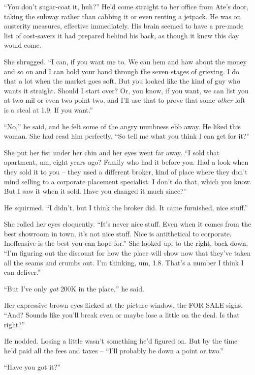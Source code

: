 “You don't sugar-coat it, huh?” He'd come straight to her office 
from Ate's door, taking the subway rather than cabbing it or even 
renting a jetpack. He was on austerity measures, effective immediately. 
His brain seemed to have a pre-made list of cost-savers it had prepared 
behind his back, as though it knew this day would come.

She shrugged. “I can, if you want me to. We can hem and haw about the 
money and so on and I can hold your hand through the seven stages of 
grieving. I do that a lot when the market goes soft. But you looked 
like the kind of guy who wants it straight. Should I start over? Or, 
you know, if you want, we can list you at two mil or even two point 
two, and I'll use that to prove that some \emph{other} loft is a steal 
at 1.9. If you want.”

“No,” he said, and he felt some of the angry numbness ebb away. He 
liked this woman. She had read him perfectly. “So tell me what you 
think I can get for it?”

She put her fist under her chin and her eyes went far away. “I sold 
that apartment, um, eight years ago? Family who had it before you. Had 
a look when they sold it to you -- they used a different broker, kind 
of place where they don't mind selling to a corporate placement 
specialist. I don't do that, which you know. But I saw it when it sold. 
Have you changed it much since?”

He squirmed. “I didn't, but I think the broker did. It came 
furnished, nice stuff.”

She rolled her eyes eloquently. “It's never nice stuff. Even when it 
comes from the best showroom in town, it's not nice stuff. Nice is 
antithetical to corporate. Inoffensive is the best you can hope for.” 
She looked up, to the right, back down. “I'm figuring out the 
discount for how the place will show now that they've taken all the 
seams and crumbs out. I'm thinking, um, 1.8. That's a number I think I 
can deliver.”

“But I've only \emph{got} 200K in the place,” he said.

Her expressive brown eyes flicked at the picture window, the FOR SALE 
signs. “And? Sounds like you'll break even or maybe lose a little on 
the deal. Is that right?”

He nodded. Losing a little wasn't something he'd figured on. But by the 
time he'd paid all the fees and taxes -- “I'll probably be down a 
point or two.”

“Have you got it?”

